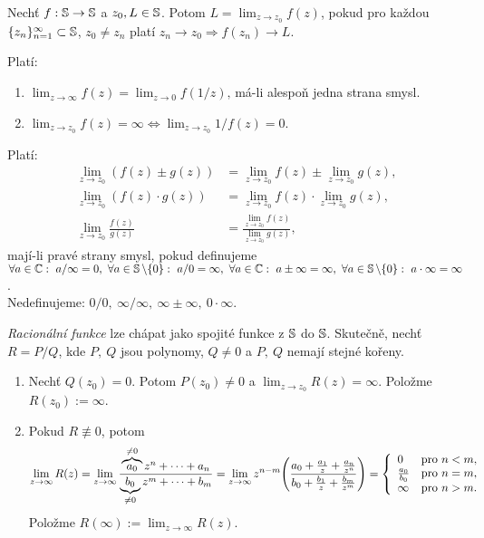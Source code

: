 \begin{definition}
Nechť $f:\operatorname{\mathbb{S}}\rightarrow\operatorname{\mathbb{S}}$ a $z_0,L\in \operatorname{\mathbb{S}}$. Potom $L=\lim_{z\rightarrow z_0}f(z)$, pokud pro každou $\{z_n\}_{n=1}^\infty\subset\operatorname{\mathbb{S}}$, $z_0\neq z_n$  platí $z_n\rightarrow z_0\Rightarrow f(z_n)\rightarrow L$.
\end{definition}

\begin{note}
Platí:
\begin{enumerate}
    \item 
        $\lim_{z\rightarrow\infty}f(z)=\lim_{z\rightarrow0}f\left(1/z\right)\text{,}$ má-li alespoň jedna strana smysl.
    \item 
        $\lim_{z\rightarrow z_0}f(z)=\infty\iff\lim_{z\rightarrow z_0}1/f(z)=0$.
\end{enumerate}
\end{note}

\begin{theorem}
Platí:
\begin{align*}
    \lim_{z\rightarrow z_0}\left(f(z)\pm g(z)\right)&=\lim_{z\rightarrow z_0}f(z)\pm\lim_{z\rightarrow z_0}g(z)\text{,}\\
    \lim_{z\rightarrow z_0}\left(f(z)\cdot g(z)\right)&=\lim_{z\rightarrow z_0}f(z)\cdot\lim_{z\rightarrow z_0}g(z)\text{,}\\ 
    \lim_{z\rightarrow z_0}\frac{f(z)}{g(z)}&=\frac{\lim_{z\rightarrow z_0}f(z)}{\lim_{z\rightarrow z_0}g(z)}\text{,}
\end{align*}
mají-li pravé strany smysl, pokud definujeme $\forall a\in \Comp:\ a/\infty=0,\ \forall a\in \Sp\setminus\{0\}:\ a/0=\infty,\ \forall a \in\Comp:\ a\pm\infty=\infty,\ \forall a\in\Sp\setminus\{0\}:\ a\cdot\infty=\infty$.\\
Nedefinujeme: $0/0,\ \infty/\infty,\ \infty\pm\infty,\ 0\cdot\infty$.
\end{theorem}
\begin{example}
\emph{Racionální funkce} lze chápat jako spojité funkce z $\operatorname{\mathbb{S}}$ do $\operatorname{\mathbb{S}}$. Skutečně, nechť $R=P/Q$, kde $P,\ Q$ jsou polynomy, $Q\neq0$ a $P,\ Q$ nemají stejné kořeny.
\begin{enumerate}
    \item 
        Nechť $Q(z_0)=0$. Potom $P(z_0)\neq0$ a $\lim_{z\rightarrow z_0}R(z)=\infty$. Položme $R(z_0):=\infty$.
    \item
        Pokud $R\not\equiv0$, potom 
        $$\lim_{z\rightarrow\infty}R(z)
        =\lim_{z\rightarrow\infty}\frac{\overbrace{a_0}^{\neq0}z^n+\cdots+a_n}{\underbrace{b_0}_{\neq0}z^m+\cdots+b_m}
        =\lim_{z\rightarrow\infty}z^{n-m}\Bigg(\frac{a_0+\frac{a_1}{z}+\frac{a_n}{z^n}}{b_0+\frac{b_1}{z}+\frac{b_m}{z^m}}\Bigg)
        =\left\{ \begin{array}{lll} 0 & \mbox{pro } n<m, \\ \frac{a_0}{b_0} & \mbox{pro } n=m, \\ \infty & \mbox{pro } n>m. \end{array} \right.$$ 
        Položme $R(\infty):=\lim_{z\rightarrow\infty}R(z)$.
\end{enumerate}
\end{example}

